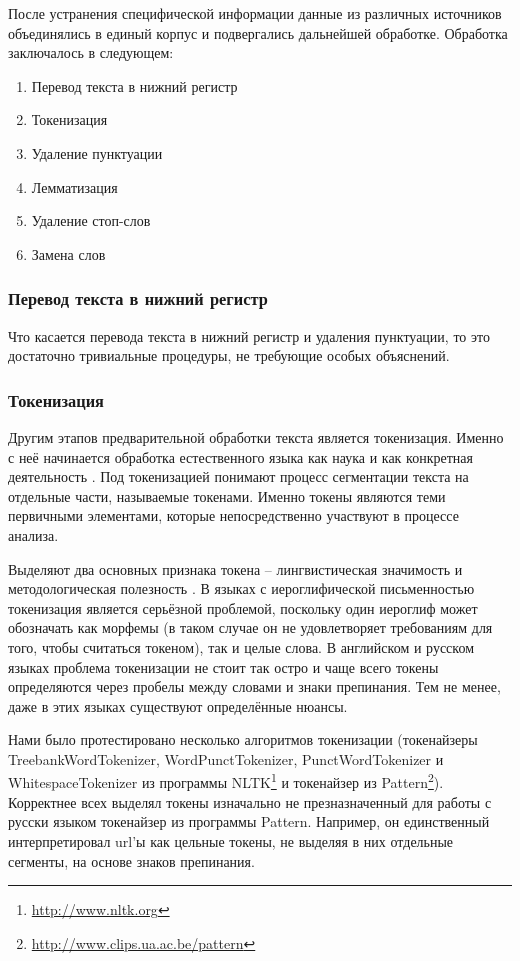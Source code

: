 После устранения специфической информации данные из различных источников объединялись в единый корпус и подвергались дальнейшей обработке. Обработка заключалось в следующем:
\begin{enumerate}
\item Перевод текста в нижний регистр
\item Токенизация %
\item Удаление пунктуации
\item Лемматизация
\item Удаление стоп-слов
\item Замена слов
\end{enumerate}

\subsubsection{Перевод текста в нижний регистр}
Что касается перевода текста в нижний регистр и удаления пунктуации, то это достаточно тривиальные процедуры, не требующие особых объяснений.

\subsubsection{Токенизация}
Другим этапов предварительной обработки текста является токенизация. Именно с неё начинается обработка естественного языка как наука и как конкретная деятельность \cite{Webster1992}. Под токенизацией понимают процесс сегментации текста на отдельные части, называемые токенами. Именно токены являются теми первичными элементами, которые непосредственно участвуют в процессе анализа. 

Выделяют два основных признака токена -- лингвистическая значимость и методологическая полезность \cite[стр. 1106]{Webster1992}. В языках с иероглифической письменностью токенизация является серьёзной проблемой, поскольку один иероглиф может обозначать как морфемы (в таком случае он не удовлетворяет требованиям для того, чтобы считаться токеном), так и целые слова. В английском и русском языках проблема токенизации не стоит так остро и чаще всего токены определяются через пробелы между словами и знаки препинания. Тем не менее, даже в этих языках существуют определённые нюансы.

Нами было протестировано несколько алгоритмов токенизации (токенайзеры TreebankWordTokenizer, WordPunctTokenizer, PunctWordTokenizer и WhitespaceTokenizer из программы NLTK\footnote{\href{http://www.nltk.org}{http://www.nltk.org}} и токенайзер из Pattern\footnote{\href{http://www.clips.ua.ac.be/pattern}{http://www.clips.ua.ac.be/pattern}}). Корректнее всех выделял токены изначально не презназначенный для работы с русски языком токенайзер из программы Pattern. Например, он единственный интерпретировал url'ы как цельные токены, не выделяя в них отдельные сегменты, на основе знаков препинания.

